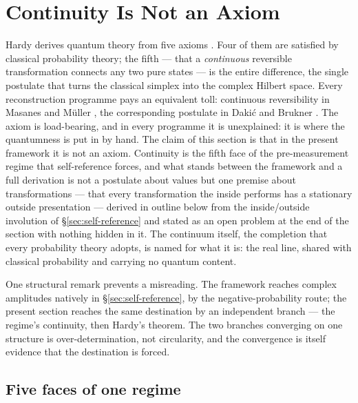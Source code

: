 \section{Continuity Is Not an Axiom}
\label{sec:continuity}

Hardy derives quantum theory from five axioms \autocite{Hardy2001a}. Four of them are satisfied
by classical probability theory; the fifth --- that a \emph{continuous} reversible
transformation connects any two pure states --- is the entire difference, the single postulate
that turns the classical simplex into the complex Hilbert space. Every reconstruction programme
pays an equivalent toll: continuous reversibility in Masanes and M\"{u}ller
\autocite{mullerp2011}, the corresponding postulate in Daki\'{c} and Brukner
\autocite{Brukner2009}. The axiom is load-bearing, and in every programme it is unexplained: it
is where the quantumness is put in by hand. The claim of this section is that in the present
framework it is not an axiom. Continuity is the fifth face of the pre-measurement regime that self-reference forces, and what
stands between the framework and a full derivation is not a postulate about values but one
premise about transformations --- that every transformation the inside performs has a stationary
outside presentation --- derived in outline below from the inside/outside involution of
\S\ref{sec:self-reference} and stated as an open problem at the end of the section with nothing
hidden in it. The continuum itself, the completion that every probability theory adopts, is
named for what it is: the real line, shared with classical probability and carrying no quantum
content.

One structural remark prevents a misreading. The framework reaches complex amplitudes natively in
\S\ref{sec:self-reference}, by the negative-probability route; the present section reaches the same
destination by an independent branch --- the regime's continuity, then Hardy's theorem. The two
branches converging on one structure is over-determination, not circularity, and the convergence is
itself evidence that the destination is forced.

\subsection{Five faces of one regime}

